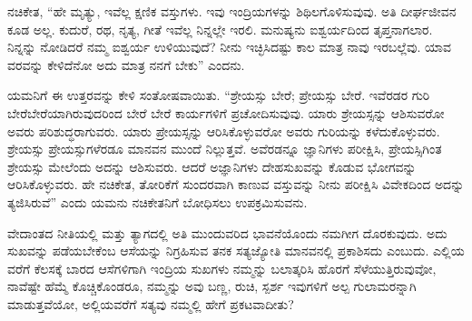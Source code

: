 ನಚಿಕೇತ, “ಹೇ ಮೃತ್ಯು, ಇವೆಲ್ಲ ಕ್ಷಣಿಕ ವಸ್ತುಗಳು. ಇವು ಇಂದ್ರಿಯಗಳನ್ನು ಶಿಥಿಲಗೊಳಿಸುವುವು. ಅತಿ ದೀರ್ಘಜೀವನ ಕೂಡ ಅಲ್ಲ. ಕುದುರೆ, ರಥ, ನೃತ್ಯ, ಗೀತೆ ಇವೆಲ್ಲ ನಿನ್ನಲ್ಲೇ ಇರಲಿ. ಮನುಷ್ಯನು ಐಶ್ವರ್ಯದಿಂದ ತೃಪ್ತನಾಗಲಾರ. ನಿನ್ನನ್ನು ನೋಡಿದರೆ ನಮ್ಮ ಐಶ್ವರ್ಯ ಉಳಿಯುವುದೆ? ನೀನು ಇಚ್ಛಿಸಿದಷ್ಟು ಕಾಲ ಮಾತ್ರ ನಾವು ಇರಬಲ್ಲೆವು. ಯಾವ ವರವನ್ನು ಕೇಳಿದೆನೋ ಅದು ಮಾತ್ರ ನನಗೆ ಬೇಕು” ಎಂದನು.

ಯಮನಿಗೆ ಈ ಉತ್ತರವನ್ನು ಕೇಳಿ ಸಂತೋಷವಾಯಿತು. “ಶ್ರೇಯಸ್ಸು ಬೇರೆ; ಪ್ರೇಯಸ್ಸು ಬೇರೆ. ಇವೆರಡರ ಗುರಿ ಬೇರೆಬೇರೆಯಾಗಿರುವುದರಿಂದ ಬೇರೆ ಬೇರೆ ಕಾರ್ಯಗಳಿಗೆ ಪ್ರಚೋದಿಸುವುವು. ಯಾರು ಶ್ರೇಯಸ್ಸನ್ನು ಆಶಿಸುವರೋ ಅವರು ಪರಿಶುದ್ಧರಾಗುವರು. ಯಾರು ಪ್ರೇಯಸ್ಸನ್ನು ಆರಿಸಿಕೊಳ್ಳುವರೋ ಅವರು ಗುರಿಯನ್ನು ಕಳೆದುಕೊಳ್ಳುವರು. ಶ್ರೇಯಸ್ಸು ಪ್ರೇಯಸ್ಸುಗಳೆರಡೂ ಮಾನವನ ಮುಂದೆ ನಿಲ್ಲುತ್ತವೆ. ಅವೆರಡನ್ನೂ ಜ್ಞಾನಿಗಳು ಪರೀಕ್ಷಿಸಿ, ಪ್ರೇಯಸ್ಸಿಗಿಂತ ಶ್ರೇಯಸ್ಸು ಮೇಲೆಂದು ಅದನ್ನು ಆಶಿಸುವರು. ಆದರೆ ಅಜ್ಞಾನಿಗಳು ದೇಹಸುಖವನ್ನು ಕೊಡುವ ಭೋಗವನ್ನು ಆರಿಸಿಕೊಳ್ಳುವರು. ಹೇ ನಚಿಕೇತ, ತೋರಿಕೆಗೆ ಸುಂದರವಾಗಿ ಕಾಣುವ ವಸ್ತುವನ್ನು ನೀನು ಪರೀಕ್ಷಿಸಿ ವಿವೇಕದಿಂದ ಅದನ್ನು ತ್ಯಜಿಸಿರುವೆ” ಎಂದು ಯಮನು ನಚಿಕೇತನಿಗೆ ಬೋಧಿಸಲು ಉಪಕ್ರಮಿಸುವನು.

ವೇದಾಂತದ ನೀತಿಯಲ್ಲಿ ಮತ್ತು ತ್ಯಾಗದಲ್ಲಿ ಅತಿ ಮುಂದುವರಿದ ಭಾವನೆಯೊಂದು ನಮಗೀಗ ದೊರಕುವುದು. ಅದು ಸುಖವನ್ನು ಪಡೆಯಬೇಕೆಂಬ ಆಸೆಯನ್ನು ನಿಗ್ರಹಿಸುವ ತನಕ ಸತ್ಯಜ್ಯೋತಿ ಮಾನವನಲ್ಲಿ ಪ್ರಕಾಶಿಸದು ಎಂಬುದು. ಎಲ್ಲಿಯ ವರೆಗೆ ಕೆಲಸಕ್ಕೆ ಬಾರದ ಆಸೆಗಳಿಗಾಗಿ ಇಂದ್ರಿಯ ಸುಖಗಳು ನಮ್ಮನ್ನು ಬಲಾತ್ಕರಿಸಿ ಹೊರಗೆ ಸೆಳೆಯುತ್ತಿರುವುವೋ, ನಾವೆಷ್ಟೇ ಹೆಮ್ಮೆ ಕೊಚ್ಚಿಕೊಂಡರೂ, ನಮ್ಮನ್ನು ಅವು ಬಣ್ಣ, ರುಚಿ, ಸ್ಪರ್ಶ ಇವುಗಳಿಗೆ ಅಲ್ಪ ಗುಲಾಮರನ್ನಾಗಿ ಮಾಡುತ್ತವೆಯೋ, ಅಲ್ಲಿಯವರೆಗೆ ಸತ್ಯವು ನಮ್ಮಲ್ಲಿ ಹೇಗೆ ಪ್ರಕಟವಾದೀತು?

